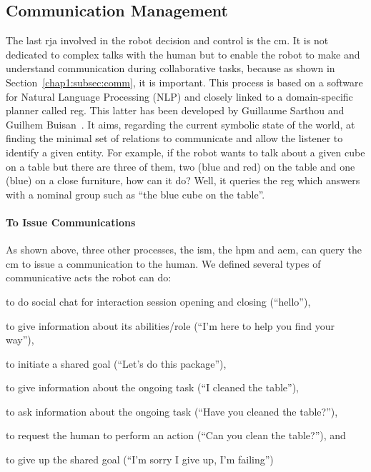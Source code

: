 \documentclass[a4paper,11pt,twoside]{StyleThese}
\begin{document}
\subsection{Communication Management}
The last \acrshort{rja} involved in the robot decision and control is the \acrfull{cm}. It is not dedicated to complex talks with the human but to enable the robot to make and understand communication during collaborative tasks, because as shown in Section~\ref{chap1:subsec:comm}, it is important. This process is based on a software for Natural Language Processing (NLP) and closely linked to a domain-specific planner called \acrfull{reg}. This latter has been developed by Guillaume Sarthou and Guilhem Buisan~\cite{buisan_2020_efficient}. It aims, regarding the current symbolic state of the world, at finding the minimal set of relations to communicate and allow the listener to identify a given entity. For example, if the robot wants to talk about a given cube on a table but there are three of them, two (blue and red) on the table and one (blue) on a close furniture, how can it do? Well, it queries the \acrshort{reg} which answers with a nominal group such as ``the blue cube on the table''.


\paragraph{To  Issue Communications}
As shown above, three other processes, the \acrlong{ism}, the \acrlong{hpm} and \acrlong{aem}, can query the \acrshort{cm} to issue a communication to the human. We defined several types of communicative acts the robot can do:
\begin{inlineEnumerate}
	\item to do social chat for interaction session opening and closing (\eg ``hello''),
	\item to give information about its abilities/role (\eg ``I'm here to help you find your way''),
	\item to initiate a shared goal (\eg ``Let's do this package''),
	\item to give information about the ongoing task (\eg ``I cleaned the table''),\label{chap2:emum:comm1}
	\item to ask information about the ongoing task (\eg ``Have you cleaned the table?''),
	\item to request the human to perform an action (\eg ``Can you clean the table?''), and\label{chap2:emum:comm2}
	\item to give up the shared goal (\eg ``I'm sorry I give up, I'm failing'')
\end{inlineEnumerate}
\end{document}
